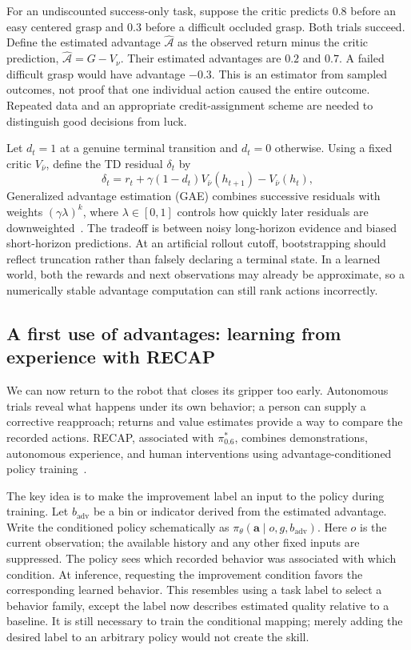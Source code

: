 For an undiscounted success-only task, suppose the critic predicts $0.8$ before an easy centered grasp and $0.3$ before a difficult occluded grasp. Both trials succeed. Define the estimated advantage $\widehat{\mathcal A}$ as the observed return minus the critic prediction, $\widehat{\mathcal A}=G-V_\nu$. Their estimated advantages are $0.2$ and $0.7$. A failed difficult grasp would have advantage $-0.3$. This is an estimator from sampled outcomes, not proof that one individual action caused the entire outcome. Repeated data and an appropriate credit-assignment scheme are needed to distinguish good decisions from luck.

Let $d_t=1$ at a genuine terminal transition and $d_t=0$ otherwise. Using a fixed critic $V_{\bar\nu}$, define the TD residual $\delta_t$ by
\begin{equation}
 \delta_t=r_t+\gamma(1-d_t)V_{\bar\nu}(h_{t+1})-V_{\bar\nu}(h_t),
\end{equation}
Generalized advantage estimation (GAE) combines successive residuals with weights $(\gamma\lambda)^k$, where $\lambda\in[0,1]$ controls how quickly later residuals are downweighted~\citep{gae}. The tradeoff is between noisy long-horizon evidence and biased short-horizon predictions. At an artificial rollout cutoff, bootstrapping should reflect truncation rather than falsely declaring a terminal state. In a learned world, both the rewards and next observations may already be approximate, so a numerically stable advantage computation can still rank actions incorrectly.

\subsection{A first use of advantages: learning from experience with RECAP}
We can now return to the robot that closes its gripper too early. Autonomous trials reveal what happens under its own behavior; a person can supply a corrective reapproach; returns and value estimates provide a way to compare the recorded actions. RECAP, associated with $\pi^*_{0.6}$, combines demonstrations, autonomous experience, and human interventions using advantage-conditioned policy training~\citep{recap}.

The key idea is to make the improvement label an input to the policy during training. Let $b_{\mathrm{adv}}$ be a bin or indicator derived from the estimated advantage. Write the conditioned policy schematically as $\pi_\theta(\mathbf a\mid o,g,b_{\mathrm{adv}})$. Here $o$ is the current observation; the available history and any other fixed inputs are suppressed. The policy sees which recorded behavior was associated with which condition. At inference, requesting the improvement condition favors the corresponding learned behavior. This resembles using a task label to select a behavior family, except the label now describes estimated quality relative to a baseline. It is still necessary to train the conditional mapping; merely adding the desired label to an arbitrary policy would not create the skill.

